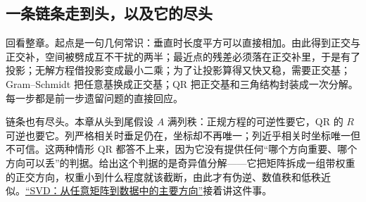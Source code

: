\subsection{一条链条走到头，以及它的尽头}

回看整章。起点是一句几何常识：垂直时长度平方可以直接相加。由此得到正交与正交补，空间被劈成互不干扰的两半；最近点的残差必须落在正交补里，于是有了投影；无解方程借投影变成最小二乘；为了让投影算得又快又稳，需要正交基；Gram--Schmidt 把任意基换成正交基；QR 把正交基和三角结构封装成一次分解。每一步都是前一步遗留问题的直接回应。

链条也有尽头。本章从头到尾假设 \(A\) 满列秩：正规方程的可逆性要它，QR 的 \(R\) 可逆也要它。列严格相关时垂足仍在，坐标却不再唯一；列近乎相关时坐标唯一但不可信。这两种情形 QR 都答不上来，因为它没有提供任何``哪个方向重要、哪个方向可以丢''的判据。给出这个判据的是奇异值分解——它把矩阵拆成一组带权重的正交方向，权重小到什么程度就该截断，由此才有伪逆、数值秩和低秩近似。\hyperref[ch:022]{``SVD：从任意矩阵到数据中的主要方向''}接着讲这件事。
